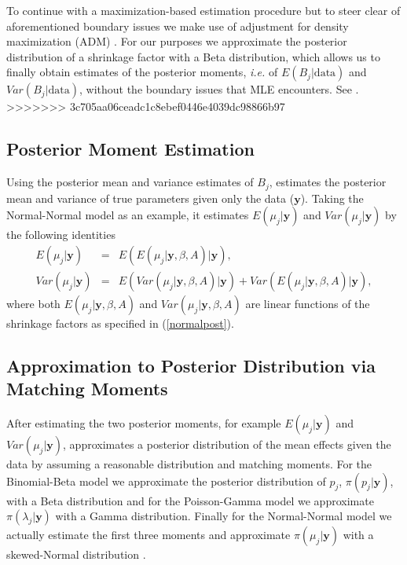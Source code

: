\documentclass[article]{jss}
\begin{document}
To continue with a maximization-based estimation procedure but to steer clear of aforementioned boundary issues we make use of adjustment for density maximization (ADM) \citep{carl1988, 1997, 2011}. For our purposes we approximate the posterior distribution of a shrinkage factor with a Beta distribution, which allows us to finally obtain estimates of the posterior moments, \emph{i.e.}  of $E(B_{j}\vert\textrm{data})$ and $Var(B_{j}\vert\textrm{data})$, without the boundary issues that MLE encounters. See \cite{2011}.
>>>>>>> 3c705aa06ceadc1c8ebef0446e4039dc98866b97

\subsection[Posterior Moment Estimation]{Posterior Moment Estimation}

Using the posterior mean and variance estimates of $B_{j}$,  estimates the posterior mean and variance of true parameters given only the data ($\textbf{y}$). Taking the Normal-Normal model as an example, it estimates $E(\mu_{j}\vert \textbf{y})$ and $Var(\mu_{j}\vert \textbf{y})$ by the following identities
\begin{eqnarray}
E(\mu_{j}\vert \textbf{y}) & = & E(E(\mu_{j}\vert \textbf{y}, \beta, A)\vert \textbf{y}), \\
Var(\mu_{j}\vert \textbf{y}) & = & E(Var(\mu_{j}\vert \textbf{y}, \beta, A)\vert \textbf{y})+Var(E(\mu_{j}\vert \textbf{y}, \beta, A)\vert \textbf{y}),
\end{eqnarray}  
where both $E(\mu_{j}\vert \textbf{y}, \beta, A)$ and $Var(\mu_{j}\vert \textbf{y}, \beta, A)$ are linear functions of the shrinkage factors as specified in (\ref{normalpost}).

\subsection[Approximation to Posterior Distribution by Moment Matching]{Approximation to Posterior Distribution via Matching Moments}
After estimating the two posterior moments, for example $E(\mu_{j}\vert \textbf{y})$ and $Var(\mu_{j}\vert \textbf{y})$,  approximates a posterior distribution of the mean effects given the data by assuming a reasonable distribution and matching moments. For the Binomial-Beta model we approximate the posterior distribution of $p_{j}$, $\pi(p_{j}\vert \textbf{y})$, with a Beta distribution and for the Poisson-Gamma model we approximate $\pi(\lambda_{j}\vert \textbf{y})$ with a Gamma distribution. Finally for the Normal-Normal model we actually estimate the first three moments and approximate $\pi(\mu_{j}\vert \textbf{y})$ with a skewed-Normal distribution \citep{sn2013}. 
\end{document}
